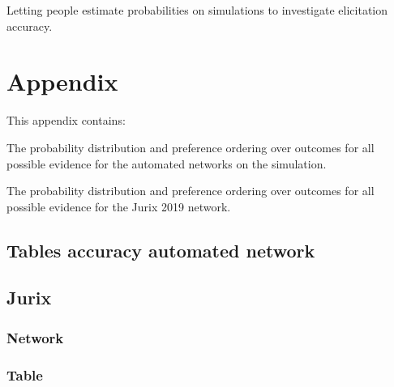 \documentclass[12pt]{article}
\begin{document}
Letting people estimate probabilities on simulations to investigate elicitation accuracy.

\newpage



\newpage


\section{Appendix}

This appendix contains:

The probability distribution and preference ordering over outcomes for all possible evidence for the automated networks on the simulation.

The probability distribution and preference ordering over outcomes for all possible evidence for the Jurix 2019 network.

\newpage
\subsection{Tables accuracy automated network}
%
\newpage



\subsection{Jurix}
\subsubsection{Network}


\subsubsection{Table}
%
\end{document}
